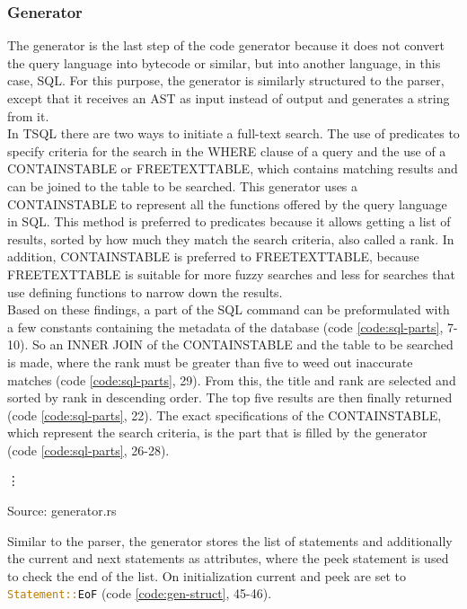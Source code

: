 \subsubsection{Generator}
The generator is the last step of the code generator because it does not convert the query language into bytecode or similar, but into another language, in this case, \ac{SQL}. For this purpose, the generator is similarly structured to the parser, except that it receives an \ac{AST} as input instead of output and generates a string from it.\\
In \ac{TSQL} there are two ways to initiate a full-text search. The use of predicates to specify criteria for the search in the WHERE clause of a query and the use of a CONTAINSTABLE or FREETEXTTABLE, which contains matching results and can be joined to the table to be searched. This generator uses a CONTAINSTABLE to represent all the functions offered by the query language in \ac{SQL}. This method is preferred to predicates because it allows getting a list of results, sorted by how much they match the search criteria, also called a rank. In addition, CONTAINSTABLE is preferred to FREETEXTTABLE, because FREETEXTTABLE is suitable for more fuzzy searches and less for searches that use defining functions to narrow down the results.\\
Based on these findings, a part of the SQL command can be preformulated with a few constants containing the metadata of the database (code \ref{code:sql-parts}, 7-10). So an INNER JOIN of the CONTAINSTABLE and the table to be searched is made, where the rank must be greater than five to weed out inaccurate matches (code \ref{code:sql-parts}, 29). From this, the title and rank are selected and sorted by rank in descending order. The top five results are then finally returned (code \ref{code:sql-parts}, 22). The exact specifications of the CONTAINSTABLE, which represent the search criteria, is the part that is filled by the generator (code \ref{code:sql-parts}, 26-28).
\begin{codeenv}
    \label{code:sql-parts}
    
    \vdots
    
    \centerline{Source: generator.rs}
\end{codeenv}
Similar to the parser, the generator stores the list of statements and additionally the current and next statements as attributes, where the peek statement is used to check the end of the list. On initialization current and peek are set to \lstinline[language=Rust]$Statement::EoF$ (code \ref{code:gen-struct}, 45-46).
